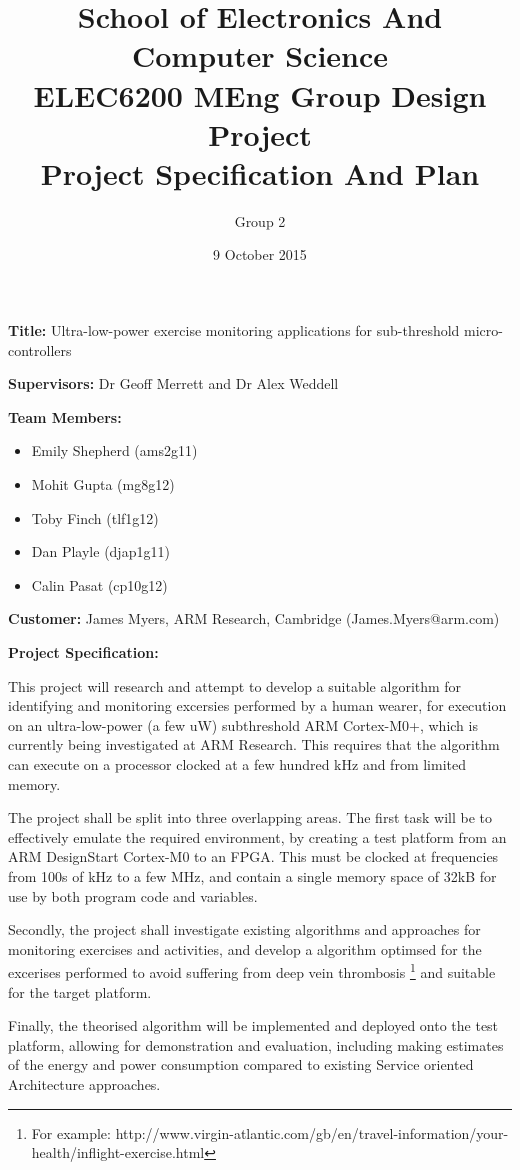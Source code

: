 \documentclass{article}
\title{School of Electronics And Computer Science \\
ELEC6200 MEng Group Design Project \\
Project Specification And Plan}
\author{Group 2}
\date{9 October 2015}
\begin{document}
\maketitle

\textbf{Title:} Ultra-low-power exercise monitoring applications for sub-threshold micro-controllers

\textbf{Supervisors:} Dr Geoff Merrett and Dr Alex Weddell

\textbf{Team Members:}
\begin{itemize}
    \item Emily Shepherd (ams2g11)
    \item Mohit Gupta (mg8g12)
    \item Toby Finch (tlf1g12)
    \item Dan Playle (djap1g11)
    \item Calin Pasat (cp10g12)
\end{itemize}

\textbf{Customer:} James Myers, ARM Research, Cambridge (James.Myers@arm.com)

\textbf{Project Specification:}

This project will research and attempt to develop a suitable algorithm for identifying and
monitoring excersies performed by a human wearer, for execution on an ultra-low-power
(a few uW) subthreshold ARM Cortex-M0+, which is currently being investigated at ARM Research.
This requires that the algorithm can execute on a processor clocked at a few hundred
kHz and from limited memory.

The project shall be split into three overlapping areas. The first task will be to effectively
emulate the required environment, by creating a test platform from an ARM DesignStart Cortex-M0
to an FPGA. This must be clocked at frequencies from 100s of kHz to a few MHz, and contain a
single memory space of 32kB for use by both program code and variables. 

Secondly, the project shall investigate existing algorithms and approaches for monitoring
exercises and activities, and develop a algorithm optimsed for the excerises performed to avoid
suffering from deep vein thrombosis
\footnote{For example: http://www.virgin-atlantic.com/gb/en/travel-information/your-health/inflight-exercise.html}
and suitable for the target platform.

Finally, the theorised algorithm will be implemented and deployed onto the test platform, allowing
for demonstration and evaluation, including making estimates of the energy and power consumption
compared to existing Service oriented Architecture approaches.
\end{document}
